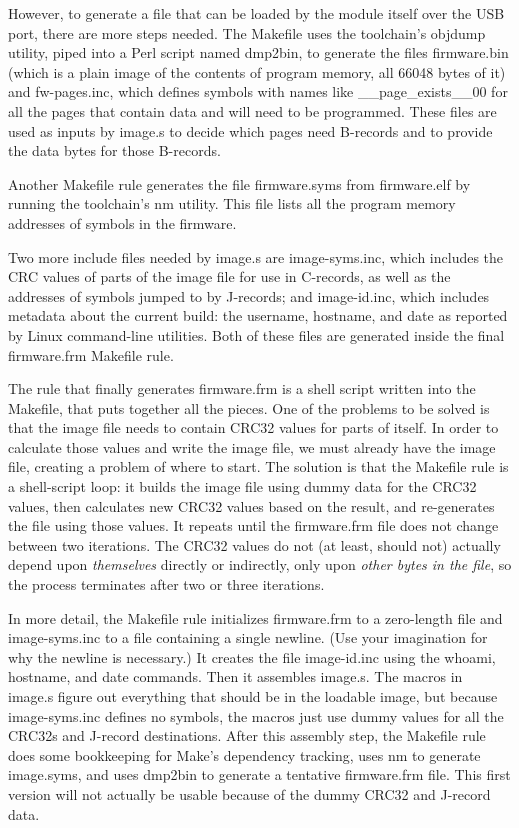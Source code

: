 However, to generate a file that can be loaded by the module itself over the
USB port, there are more steps needed.  The Makefile uses the toolchain's
objdump utility, piped into a Perl script named dmp2bin, to generate the
files firmware.bin (which is a plain image of the contents of program
memory, all 66048 bytes of it) and fw-pages.inc, which defines symbols with
names like \_\_page\_exists\_\_00 for all the pages that contain data and
will need to be programmed.  These files are used as inputs by image.s to
decide which pages need B-records and to provide the data bytes for those
B-records.

Another Makefile rule generates the file firmware.syms from firmware.elf by
running the toolchain's nm utility.  This file lists all the program memory
addresses of symbols in the firmware.

Two more include files needed by image.s are image-syms.inc, which includes
the CRC values of parts of the image file for use in C-records, as well as
the addresses of symbols jumped to by J-records; and image-id.inc, which
includes metadata about the current build:  the username, hostname, and date
as reported by Linux command-line utilities.  Both of these files are
generated inside the final firmware.frm Makefile rule.

The rule that finally generates firmware.frm is a shell script written into
the Makefile, that puts together all the pieces.  One of the problems to be
solved is that the image file needs to contain CRC32 values for parts of
itself.  In order to calculate those values and write the image file, we
must already have the image file, creating a problem of where to start.  The
solution is that the Makefile rule is a shell-script loop: it builds the
image file using dummy data for the CRC32 values, then calculates new CRC32
values based on the result, and re-generates the file using those values. 
It repeats until the firmware.frm file does not change between two
iterations.  The CRC32 values do not (at least, should not) actually depend
upon \emph{themselves} directly or indirectly, only upon \emph{other bytes
in the file}, so the process terminates after two or three iterations.

In more detail, the Makefile rule initializes firmware.frm to a zero-length
file and image-syms.inc to a file containing a single newline.  (Use your
imagination for why the newline is necessary.) It creates the file
image-id.inc using the whoami, hostname, and date commands.  Then it
assembles image.s.  The macros in image.s figure out everything that should
be in the loadable image, but because image-syms.inc defines no symbols, the
macros just use dummy values for all the CRC32s and J-record destinations. 
After this assembly step, the Makefile rule does some bookkeeping for Make's
dependency tracking, uses nm to generate image.syms, and uses dmp2bin to
generate a tentative firmware.frm file.  This first version will not
actually be usable because of the dummy CRC32 and J-record data.

